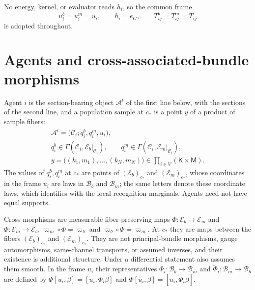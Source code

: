 No energy, kernel, or evaluator reads $h_i$, so the common frame
\begin{equation}
u_i^b=u_i^m=u_i,
\qquad
h_i=e_G,
\qquad
T_{ij}^b=T_{ij}^m=T_{ij}
\label{eq:geo-diagonal-principal}
\end{equation}
is adopted throughout.

\section{Agents and cross-associated-bundle morphisms}
\label{sec:geo-agents}
\label{sec:geo-cross-morphisms}

Agent $i$ is the section-bearing object $\mathcal A^i$ of the first line below, with the sections of
the second line, and a population sample at $c_*$ is a point $y$ of a product of sample fibers:
\begin{gather}
\mathcal A^i=\bigl(\mathcal C_i;q_i^b,q_i^m,u_i\bigr),
\label{eq:geo-agent-object}\\
q_i^b\in\Gamma(\mathcal C_i,\mathcal E_b|_{\mathcal C_i}),
\qquad
q_i^m\in\Gamma(\mathcal C_i,\mathcal E_m|_{\mathcal C_i}),
\label{eq:geo-agent-sections}\\
y=\bigl((k_1,m_1),\ldots,(k_N,m_N)\bigr)\in\prod_{i\in V}(\mathsf K\times\mathsf M).
\label{eq:geo-population-sample}
\end{gather}
The values of $q_i^b,q_i^m$ at $c_*$ are points of $(\mathcal E_b)_{c_*}$ and $(\mathcal E_m)_{c_*}$, whose
coordinates in the frame $u_i$ are laws in $\mathcal B_b$ and $\mathcal B_m$; the same letters denote
these coordinate laws, which  identifies with the local recognition
marginals. Agents need not have equal supports.

Cross morphisms are measurable fiber-preserving maps $\Phi:\mathcal E_b\to\mathcal E_m$ and
$\widetilde\Phi:\mathcal E_m\to\mathcal E_b$, $\varpi_m\circ\Phi=\varpi_b$ and
$\varpi_b\circ\widetilde\Phi=\varpi_m$.\label{eq:geo-cross-channel-map} At $c_*$ they are maps between
the fibers $(\mathcal E_b)_{c_*}$ and $(\mathcal E_m)_{c_*}$. They are not principal-bundle morphisms, gauge automorphisms, same-channel transports, or assumed inverses,
and their existence is additional structure. Under  a differential
statement also assumes them smooth. In the frame $u_i$ their representatives
$\Phi_i:\mathcal B_b\to\mathcal B_m$ and $\widetilde\Phi_i:\mathcal B_m\to\mathcal B_b$ are defined
by $\Phi[u_i,\beta]=[u_i,\Phi_i\beta]$ and $\widetilde\Phi[u_i,\beta]=[u_i,\widetilde\Phi_i\beta]$.

